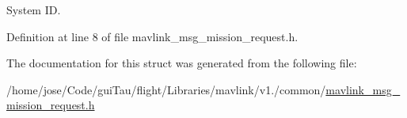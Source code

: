 System I\-D. 



Definition at line 8 of file mavlink\-\_\-msg\-\_\-mission\-\_\-request.\-h.



The documentation for this struct was generated from the following file\-:\begin{DoxyCompactItemize}
\item 
/home/jose/\-Code/gui\-Tau/flight/\-Libraries/mavlink/v1./common/\hyperlink{mavlink__msg__mission__request_8h}{mavlink\-\_\-msg\-\_\-mission\-\_\-request.\-h}\end{DoxyCompactItemize}
